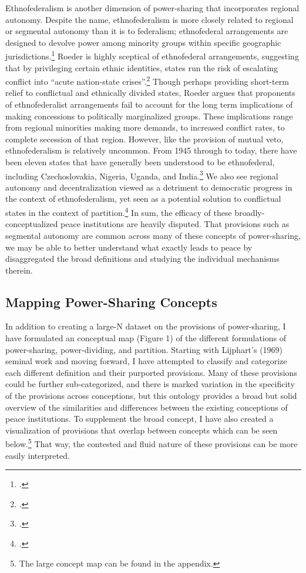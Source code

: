 \documentclass[12pt]{article}
\begin{document}
Ethnofederalism is another dimension of power-sharing that incorporates regional autonomy. Despite the name, ethnofederalism is more closely related to regional or segmental autonomy than it is to federalism; ethnofederal arrangements are designed to devolve power among minority groups within specific geographic jurisdictions.\footcite{roeder_where_2007, roeder_ethnofederalism_2009} Roeder is highly sceptical of ethnofederal arrangements, suggesting that by privileging certain ethnic identities, states run the risk of escalating conflict into ``acute nation-state crises''.\footcite[206]{roeder_ethnofederalism_2009} Though perhaps providing short-term relief to conflictual and ethnically divided states, Roeder argues that proponents of ethnofederalist arrangements fail to account for the long term implications of making concessions to politically marginalized groups. These implications range from regional minorities making more demands, to increased conflict rates, to complete secession of that region. However, like the provision of mutual veto, ethnofederalism is relatively uncommon. From 1945 through to today, there have been eleven states that have generally been understood to be ethnofederal, including Czechoslovakia, Nigeria, Uganda, and India.\footcite{lake_policy_1996} We also see regional autonomy and decentralization viewed as a detriment to democratic progress in the context of ethnofederalism, yet seen as a potential solution to conflictual states in the context of partition.\footcite{roeder_sustainable_2003, roeder_where_2007, roeder_ethnofederalism_2009} In sum, the efficacy of these broadly-conceptualized peace institutions are heavily disputed. That provisions such as segmental autonomy are common across many of these concepts of power-sharing, we may be able to better understand what exactly leads to peace by disaggregated the broad definitions and studying the individual mechanisms therein. 

\subsection{Mapping Power-Sharing Concepts}
In addition to creating a large-N dataset on the provisions of power-sharing, I have formulated an conceptual map (Figure 1) of the different formulations of power-sharing, power-dividing, and partition. Starting with Lijphart’s (1969) seminal work and moving forward, I have attempted to classify and categorize each different definition and their purported provisions. Many of these provisions could be further sub-categorized, and there is marked variation in the specificity of the provisions across conceptions, but this ontology provides a broad but solid overview of the similarities and differences between the existing conceptions of peace institutions. To supplement the broad concept, I have also created a visualization of provisions that overlap between concepts which can be seen below.\footnote{The large concept map can be found in the appendix.} That way, the contested and fluid nature of these provisions can be more easily interpreted.  
\end{document}
